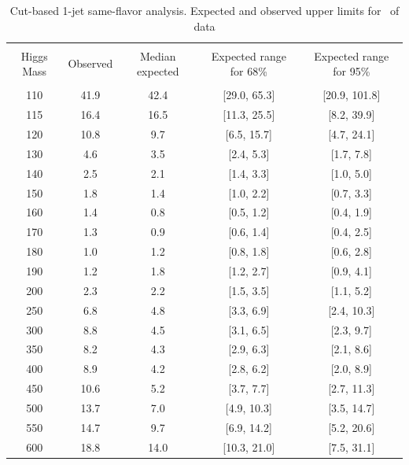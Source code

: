 \begin{table}[!hbp]
\begin{center}
\begin{tabular}{c c c c c}
\hline
\vspace{-3mm} && \\
 Higgs Mass   & Observed & Median expected & Expected range for 68\% & Expected range for 95\%   \\
\vspace{-3mm} && \\
\hline
110 & 41.9 & 42.4 & [29.0, 65.3] & [20.9, 101.8] \\
115 & 16.4 & 16.5 & [11.3, 25.5] & [8.2, 39.9] \\
120 & 10.8 & 9.7 & [6.5, 15.7] & [4.7, 24.1] \\
130 & 4.6 & 3.5 & [2.4, 5.3] & [1.7, 7.8] \\
140 & 2.5 & 2.1 & [1.4, 3.3] & [1.0, 5.0] \\
150 & 1.8 & 1.4 & [1.0, 2.2] & [0.7, 3.3] \\
160 & 1.4 & 0.8 & [0.5, 1.2] & [0.4, 1.9] \\
170 & 1.3 & 0.9 & [0.6, 1.4] & [0.4, 2.5] \\
180 & 1.0 & 1.2 & [0.8, 1.8] & [0.6, 2.8] \\
190 & 1.2 & 1.8 & [1.2, 2.7] & [0.9, 4.1] \\
200 & 2.3 & 2.2 & [1.5, 3.5] & [1.1, 5.2] \\
250 & 6.8 & 4.8 & [3.3, 6.9] & [2.4, 10.3] \\
300 & 8.8 & 4.5 & [3.1, 6.5] & [2.3, 9.7] \\
350 & 8.2 & 4.3 & [2.9, 6.3] & [2.1, 8.6] \\
400 & 8.9 & 4.2 & [2.8, 6.2] & [2.0, 8.9] \\
450 & 10.6 & 5.2 & [3.7, 7.7] & [2.7, 11.3] \\
500 & 13.7 & 7.0 & [4.9, 10.3] & [3.5, 14.7] \\
550 & 14.7 & 9.7 & [6.9, 14.2] & [5.2, 20.6] \\
600 & 18.8 & 14.0 & [10.3, 21.0] & [7.5, 31.1] \\
\hline
\end{tabular}
\caption{Cut-based 1-jet same-flavor analysis. Expected and observed
  upper limits for \intlumi\ of data}
\label{tab:sf1_cut}
\end{center}
\end{table}

